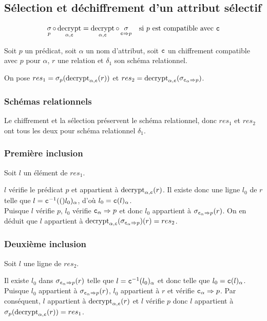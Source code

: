 \documentclass[french]{article}
\DeclareMathOperator{\sel}{\sigma}
\DeclareMathOperator{\decrypt}{decrypt}
\newcommand\typeT[1]{\text{\ttfamily #1}}
\newcommand{\decryptArgs}[2]{\decrypt_{#1 , \typeT{#2}}}
\newcommand{\selP}{\sel_p}
\newcommand{\decryptCAlpha}{\decryptArgs{\alpha}{c}}
\newcommand{\cy}[1]{\typeT{c}(#1)}
\newcommand{\dc}[1]{\typeT{c}^{-1}(#1)}
\begin{document}
\subsection*{Sélection et déchiffrement d'un attribut sélectif}
\begin{align}
\selP \circ \decryptCAlpha 
& = \decryptCAlpha \circ \sel_{\typeT{c} \Rightarrow p}
& \text{si $p$  est compatible avec $\typeT{c}$}
\end{align}


Soit $p$ un prédicat, soit $\alpha$ un nom d'attribut,
soit $\typeT{c}$ un chiffrement compatible avec $p$ pour $\alpha$,
$r$ une relation
et $\delta_1$ son schéma relationnel.

\newcommand{\adap}{\typeT{c}_\alpha \Rightarrow p}

On pose
$res_1 = \selP(\decryptCAlpha(r))$
et
$res_2   = \decryptCAlpha(\sel_{\adap})$.

\subsubsection*{Schémas relationnels}
Le chiffrement et la sélection
préservent le schéma relationnel,
donc $res_1$ et $res_2$ ont tous les deux
pour schéma relationnel $\delta_1$.

\subsubsection*{Première inclusion}
Soit $l$ un élément de $res_1$.

$l$ vérifie le prédicat $p$ et 
appartient à $\decryptCAlpha(r)$.
Il existe donc une ligne $l_0$ de $r$
telle que $l = \dc(l_0)_\alpha$, d'où
$l_0 = \cy{l}_\alpha$. \\

Puisque $l$ vérifie $p$,
$l_0$ vérifie $\adap$
et donc $l_0$ appartient à $\sel_{\adap}(r)$.
On en déduit que $l$ appartient à
$\decryptCAlpha(\sel_{\adap})(r) = res_2$.

\subsubsection*{Deuxième inclusion}
Soit $l$ une ligne de $res_2$.

Il existe $l_0$ dans $\sel_{\adap}(r)$
telle que $l = \dc{l_0}_\alpha$ et donc
telle que $l_0 = \cy{l}_\alpha$. \\

Puisque $l_0$ appartient à $\sel_{\adap}(r)$,
$l_0$ appartient à $r$ et vérifie $\adap$.
Par conséquent, $l$ appartient à $\decryptCAlpha(r)$
et $l$ vérifie $p$ donc $l$
appartient à $\selP(\decryptCAlpha(r)) = res_1$.
\end{document}
